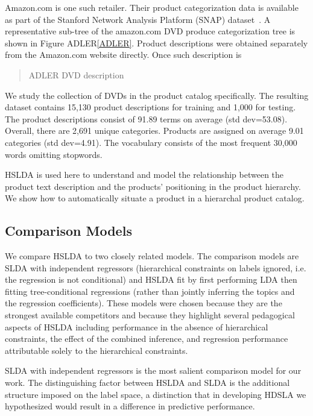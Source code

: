 Amazon.com is one such retailer.  Their product categorization data is available as part of the 
 Stanford Network Analysis Platform (SNAP) dataset~\cite{SNAP}.    A representative sub-tree of the amazon.com DVD produce categorization tree is shown in Figure ADLER\ref{ADLER}.  
Product descriptions were obtained separately from the
Amazon.com website directly. Once such description is
\begin{quote}
{ADLER DVD description }
\end{quote}
We study the collection of DVDs
in the product catalog specifically.
The resulting dataset contains 15,130 product descriptions for training and 1,000
for testing. The product descriptions consist of
91.89 terms on average (std dev=53.08). Overall, there are 2,691 unique categories.
Products are assigned on average 9.01 categories (std dev=4.91). The vocabulary
consists of the most frequent 30,000 words omitting stopwords. 

HSLDA is used here to understand and model the relationship between the product text description and the products' positioning in the product hierarchy.  We show how to automatically situate a product in a hierarchal product catalog.  


\subsection{Comparison Models}

We compare HSLDA to two closely related models. The comparison models are SLDA with independent
regressors (hierarchical constraints on labels ignored,  i.e. the regression is not conditional) and HSLDA fit by first
performing LDA then fitting tree-conditional regressions (rather than jointly inferring the topics and the regression coefficients). These models were
chosen because they are the strongest available competitors and because they  highlight several pedagogical aspects of HSLDA including performance in the
absence  of hierarchical constraints, the effect of the combined inference, and
regression performance attributable solely to the hierarchical constraints.

SLDA with independent regressors is the most salient comparison model
for our work. The distinguishing factor between HSLDA and SLDA is the
additional structure imposed on the label space, a distinction that in developing HDSLA we
hypothesized would result in a difference in predictive performance. 

